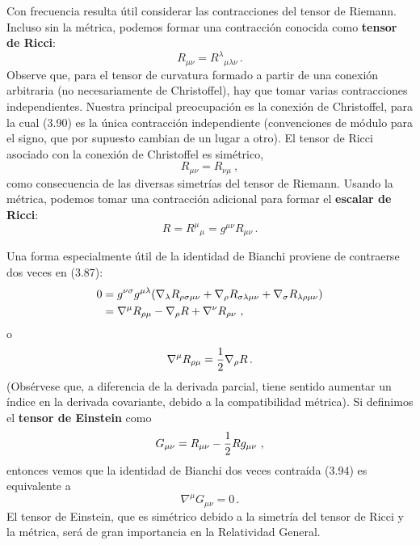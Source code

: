 \documentclass[11pt,b5paper,openany,twoside]{book}
\newcommand{\mn}{{\mu\nu}}
\begin{document}
Con frecuencia resulta útil considerar las contracciones del tensor de Riemann.
Incluso sin la métrica, podemos formar una contracción conocida como {\bf tensor de Ricci}:
\begin{equation}
R_{\mn} = R^\lambda{}_{\mu\lambda\nu}\,.\label{3.90}
\end{equation}
Observe que, para el tensor de curvatura formado a partir de una conexión arbitraria (no necesariamente de Christoffel), hay que tomar varias contracciones independientes.
Nuestra principal preocupación es la conexión de Christoffel, para la cual (3.90) es la única contracción independiente (convenciones de módulo para el signo, que por supuesto cambian de un lugar a otro).
El tensor de Ricci asociado con la conexión de Christoffel es simétrico,
\begin{equation}
R_{\mn} = R_{\nu\mu}\ ,\label{3.91}
\end{equation}
como consecuencia de las diversas simetrías del tensor de Riemann.
Usando la métrica, podemos tomar una contracción adicional para formar el {\bf escalar de Ricci}:
\begin{equation}
R = R^\mu{}_\mu = g^\mn R_\mn\,.\label{3.92}
\end{equation}

Una forma especialmente útil de la identidad de Bianchi proviene de contraerse dos veces en (3.87):
\begin{align}
0&=  g^{\nu\sigma}g^{\mu\lambda}(\nabla_\lambda R_{\rho\sigma\mn}
+\nabla_\rho R_{\sigma\lambda\mn}+\nabla_\sigma R_{\lambda\rho\mn}) \notag \\
&= \nabla^\mu R_{\rho\mu}-\nabla_\rho R + \nabla^\nu R_{\rho\nu}\ ,
\label{3.93}
\end{align}
o
\begin{equation}
\nabla^\mu R_{\rho\mu} = {1\over 2}\nabla_\rho R\,.\label{3.94}
\end{equation}
(Obsérvese que, a diferencia de la derivada parcial, tiene sentido aumentar un índice en la derivada covariante, debido a la compatibilidad métrica).
Si definimos el {\bf tensor de Einstein} como
\begin{equation}
G_{\mu\nu} = R_\mn -{1\over 2} R g_\mn\ ,\label{3.95}
\end{equation}
entonces vemos que la identidad de Bianchi dos veces contraída (3.94) es equivalente a
\begin{equation}
\nabla^\mu G_{\mn} = 0\,.\label{3.96}
\end{equation}
El tensor de Einstein, que es simétrico debido a la simetría del tensor de Ricci y la métrica, será de gran importancia en la Relatividad General.
\end{document}
